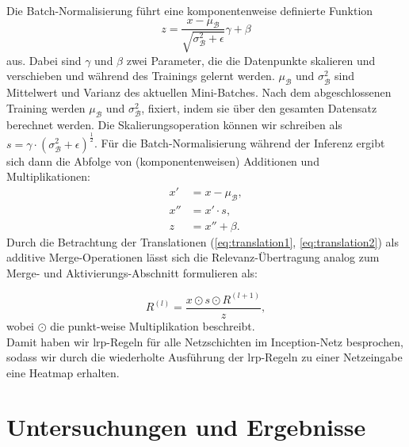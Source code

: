 \documentclass[twoside, 12pt,a4paper]{book}
\numberwithin{equation}{section}
\begin{document}
	\noindent Die Batch-Normalisierung führt eine komponentenweise definierte Funktion 
	\begin{equation}
		z = \frac{x -\mu_\mathcal{B}}{\sqrt{\sigma_\mathcal{B}^2 + \epsilon}}\gamma + \beta
	\end{equation}
	aus. Dabei sind $\gamma$ und $\beta$ zwei Parameter, die die Datenpunkte skalieren und verschieben und während des Trainings gelernt werden. $\mu_\mathcal{B}$ und $\sigma_\mathcal{B}^2$ sind Mittelwert und Varianz des aktuellen Mini-Batches. Nach dem abgeschlossenen Training werden $\mu_\mathcal{B}$ und $\sigma_\mathcal{B}^2$, fixiert, indem sie über den gesamten Datensatz berechnet werden. Die Skalierungsoperation können wir schreiben als $s=\gamma \cdot (\sigma_\mathcal{B}^2 + \epsilon)^{\frac{1}{2}}$. Für die Batch-Normalisierung während der Inferenz ergibt sich dann die Abfolge von (komponentenweisen) Additionen und Multiplikationen:
	\begin{align}
		x' &= x- \mu_\mathcal{B}, \label{eq:translation1}\\
		x'' &= x' \cdot s,\\
		z &= x'' + \beta. \label{eq:translation2}
	\end{align}
	Durch die Betrachtung der Translationen (\autoref{eq:translation1}, \autoref{eq:translation2}) als additive Merge-Operationen lässt sich die Relevanz-Übertragung analog zum Merge- und Aktivierungs-Abschnitt formulieren als:
	
	\begin{equation}
		R^{(l)} = \frac{x \odot s \odot R^{(l+1)}}{z},
	\end{equation}
	\noindent wobei $\odot$ die punkt-weise Multiplikation beschreibt.\\
	
	\noindent Damit haben wir \ac{lrp}-Regeln für alle Netzschichten im Inception-Netz besprochen, sodass wir durch die wiederholte Ausführung der \ac{lrp}-Regeln zu einer Netzeingabe eine Heatmap erhalten.\\
	
	
	
	
	
	 









	\chapter{Untersuchungen und Ergebnisse} \label{chapter_results}
	
\end{document}
